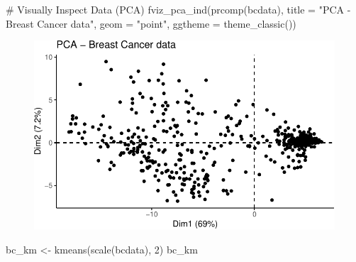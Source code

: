 \documentclass[
  letterpaper,
  DIV=11,
  numbers=noendperiod]{scrreprt}
\newenvironment{Shaded}{\begin{snugshade}}{\end{snugshade}}
\newcommand{\AttributeTok}[1]{\textcolor[rgb]{0.40,0.45,0.13}{#1}}
\newcommand{\CommentTok}[1]{\textcolor[rgb]{0.37,0.37,0.37}{#1}}
\newcommand{\DecValTok}[1]{\textcolor[rgb]{0.68,0.00,0.00}{#1}}
\newcommand{\FunctionTok}[1]{\textcolor[rgb]{0.28,0.35,0.67}{#1}}
\newcommand{\NormalTok}[1]{\textcolor[rgb]{0.00,0.23,0.31}{#1}}
\newcommand{\OtherTok}[1]{\textcolor[rgb]{0.00,0.23,0.31}{#1}}
\newcommand{\StringTok}[1]{\textcolor[rgb]{0.13,0.47,0.30}{#1}}
\begin{document}
\begin{Shaded}
\begin{Highlighting}[]
\CommentTok{\# Visually Inspect Data (PCA)}
\FunctionTok{fviz\_pca\_ind}\NormalTok{(}\FunctionTok{prcomp}\NormalTok{(bcdata), }\AttributeTok{title =} \StringTok{"PCA {-} Breast Cancer data"}\NormalTok{, }\AttributeTok{geom =} \StringTok{"point"}\NormalTok{, }\AttributeTok{ggtheme =} \FunctionTok{theme\_classic}\NormalTok{())}
\end{Highlighting}
\end{Shaded}

\begin{figure}[H]

{\centering \includegraphics{./12-clustering_files/figure-pdf/unnamed-chunk-18-1.pdf}

}

\end{figure}

\begin{Shaded}
\begin{Highlighting}[]
\NormalTok{bc\_km }\OtherTok{\textless{}{-}} \FunctionTok{kmeans}\NormalTok{(}\FunctionTok{scale}\NormalTok{(bcdata), }\DecValTok{2}\NormalTok{)}
\NormalTok{bc\_km}
\end{Highlighting}
\end{Shaded}
\end{document}
